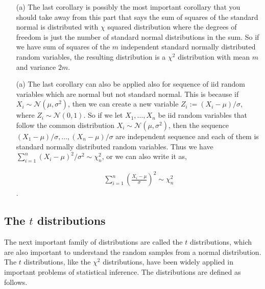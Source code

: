 \documentclass[ 11pt,%
				a4paper,%
				twoside,%
				headinclude,%
				footinclude = true,%
				cleardoublepage = empty,%
				reqno]{scrbook}
\begin{document}
\begin{remarks}
\begin{itemize}
  \item[]
  \item[(a)]  The last corollary is possibly the most important corollary that you should take away from this part that says the sum of squares of the standard normal is distributed with $\chi$ squared distribution where the degrees of freedom is just the number of standard normal distributions in the sum. So if we have sum of squares of the $m$ independent standard normally distributed random variables, the resulting distribution is a $\chi^2$ distribution with mean $m$ and variance $2m$. 

  \item[(a)] The last corollary can also be applied also for sequence of iid random variables which are normal but not standard normal. This is because if $X_{i} \sim \mathcal{N}(\mu, \sigma^2)$, then we can create a new variable $Z_i := \left(X_{i}-\mu\right) / \sigma$, where $Z_{i} \sim \mathcal{N}(0, 1)$. So if we let $X_{1}, \ldots, X_{n}$ be iid random variables that follow the common distribution $X_{i} \sim \mathcal{N}(\mu, \sigma^2)$, then the sequence $\left(X_{1}-\mu\right) / \sigma, \ldots,\left(X_{n}-\mu\right) / \sigma$ are independent sequence and each of them is standard normally distributed random variables. Thus we have$ \sum_{i=1}^{n}\left(X_{i}-\mu\right)^{2} / \sigma^{2} \sim \chi^{2}_n$, or we can also write it as,

  \begin{align}\label{eq:normalchi}
    \sum_{i=1}^{n}\left(\frac{X_{i}-\mu}{\sigma} \right) ^2\sim \chi^{2}_n
  \end{align}. 


\end{itemize}
 
\end{remarks}


\marginbreak{0pt}

\subsection{The $t$ distributions}



The next important family of distributions are called the $t$ distributions, which are also important to understand the random samples from a normal distribution. The $t$ distributions, like the $\chi^{2}$ distributions, have been widely applied in important problems of statistical inference. The distributions are defined as follows.
\end{document}
